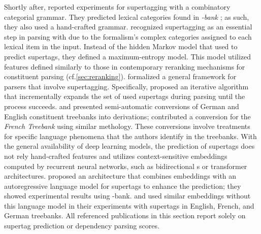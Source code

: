 \documentclass[../document.tex]{subfiles}
\begin{document}
    Shortly after, \citet{clark2002supertagging} reported experiments for supertagging with a combinatory categorial grammar.
    They predicted lexical categories found in \emph{-bank} \citep{Hoc07}; as such, they also used a hand-crafted grammar.
     recognized supertagging as an essential step in parsing with  due to the formalism's complex categories assigned to each lexical item in the input.
    Instead of the hidden Markov model that \citeauthor{bangalore1999supertagging} used to predict supertags, they defined a maximum-entropy model.
    This model utilized features defined similarly to those in contemporary reranking mechanisms for constituent parsing (cf.\@ \cref{sec:reranking}).
     formalized a general framework for parsers that involve supertagging.
    Specifically, \citeauthor{Auli12} proposed an iterative algorithm that incrementally expands the set of used supertags during parsing until the process succeeds.
     and \citet{Kaeshammer2012GermanAE} presented semi-automatic conversions of German and English constituent treebanks into  derivations; \citet{Bla18} contributed a conversion for the \emph{French Treebank} \citep{abeille2003building} using similar methology.
    These conversions involve treatments for specific language phenomena that the authors identify in the treebanks.
    With the general availability of deep learning models, the prediction of supertags does not rely hand-crafted features and utilizes context-sensitive embeddings computed by recurrent neural networks, such as bidirectional s or transformer architectures.
     proposed an architecture that combines  embeddings with an autoregressive language model for supertags to enhance the prediction; they showed experimental results using -bank.
     and \citet{Bla18} used similar embeddings without this language model in their experiments with  supertags in English, French, and German treebanks.
    All referenced publications in this section report solely on supertag prediction or dependency parsing scores.

\end{document}
